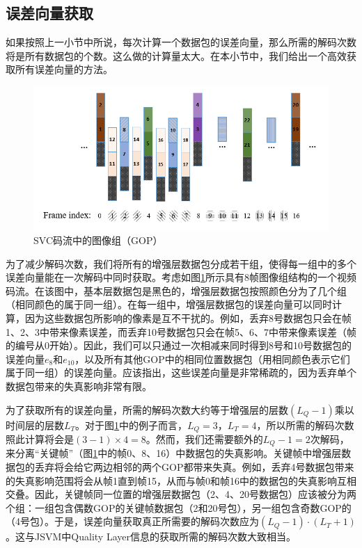 \subsection{误差向量获取}

如果按照上一小节中所说，每次计算一个数据包的误差向量，那么所需的解码次数将是所有数据包的个数。这么做的计算量太大。在本小节中，我们给出一个高效获取所有误差向量的方法。

\begin{figure}[h]
\centering
\includegraphics[width = 0.9\linewidth]{figures/GOP-Structure.png}
\caption{SVC码流中的图像组（GOP） \label{fig:GOP_Structure}}
\end{figure}

为了减少解码次数，我们将所有的增强层数据包分成若干组，使得每一组中的多个误差向量能在一次解码中同时获取。考虑如图\ref{fig:GOP_Structure}所示具有8帧图像组结构的一个视频码流。在该图中，基本层数据包是黑色的，增强层数据包按照颜色分为了几个组（相同颜色的属于同一组）。在每一组中，增强层数据包的误差向量可以同时计算，因为这些数据包所影响的像素是互不干扰的。例如，丢弃8号数据包只会在帧1、2、3中带来像素误差，而丢弃10号数据包只会在帧5、6、7中带来像素误差（帧的编号从0开始）。因此，我们可以只通过一次相减来同时得到8号和10号数据包的误差向量$e_{8}$和$e_{10}$，以及所有其他GOP中的相同位置数据包（用相同颜色表示它们属于同一组）的误差向量。应该指出，这些误差向量是非常稀疏的，因为丢弃单个数据包带来的失真影响非常有限。

为了获取所有的误差向量，所需的解码次数大约等于增强层的层数$(L_Q - 1)$乘以时间层的层数$L_T$。对于图\ref{fig:GOP_Structure}中的例子而言，$L_Q = 3$，$L_T = 4$，所以所需的解码次数照此计算将会是$(3 - 1) \times 4 = 8$。然而，我们还需要额外的$L_Q - 1 = 2$次解码，来分离“关键帧”\supercite{H.264-Overview}（图\ref{fig:GOP_Structure}中的帧0、8、16）中数据包的失真影响。关键帧中增强层数据包的丢弃将会给它两边相邻的两个GOP都带来失真。例如，丢弃4号数据包带来的失真影响范围将会从帧1直到帧15，从而与帧0和帧16中的数据包的失真影响互相交叠。因此，关键帧同一位置的增强层数据包（2、4、20号数据包）应该被分为两个组：一组包含偶数GOP的关键帧数据包（2和20号包），另一组包含奇数GOP的（4号包）。于是，误差向量获取真正所需要的解码次数应为$(L_Q - 1) \cdot (L_T + 1)$。这与JSVM中Quality Layer信息的获取所需的解码次数大致相当。

